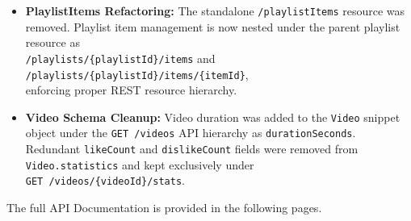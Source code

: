 \documentclass[11pt, a4paper]{report}
\begin{document}
\begin{itemize}
    \item \textbf{PlaylistItems Refactoring:} The standalone \texttt{/playlistItems} resource was removed. Playlist item management is now nested under the parent playlist resource as \\ \texttt{/playlists/\{playlistId\}/items} and \texttt{/playlists/\{playlistId\}/items/\{itemId\}},\\ enforcing proper REST resource hierarchy.

    \item \textbf{Video Schema Cleanup:} Video duration was added to the \texttt{Video} snippet object under the \texttt{GET /videos} API hierarchy as \texttt{durationSeconds}. Redundant \texttt{likeCount} and \texttt{dislikeCount} fields were removed from \texttt{Video.statistics} and kept exclusively under\\ \texttt{GET /videos/\{videoId\}/stats}.
\end{itemize}

The full API Documentation is provided in the following pages.
\newpage
\end{document}

